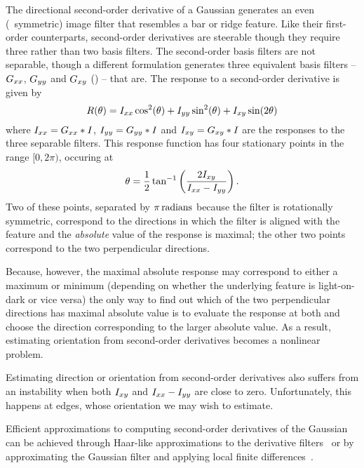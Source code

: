 \label{s:filtering_secondderivs}
%
%
%
The directional second-order derivative of a Gaussian generates an even (\ie~symmetric) image filter that resembles a bar or ridge feature. Like their first-order counterparts, second-order derivatives are steerable though they require three rather than two basis filters. The second-order basis filters are not separable, though a different formulation generates three equivalent basis filters -- $G_{xx}$, $G_{yy}$ and $G_{xy}$ () -- that are. The response to a second-order derivative is given by
%
\begin{equation}
R(\theta) = I_{xx} \cos^2(\theta) + I_{yy} \sin^2(\theta) + I_{xy} \sin(2\theta)
\label{e:secondderivs_response}
\end{equation}
%
\noindent where $I_{xx} = G_{xx}\ast I$, $I_{yy} = G_{yy}\ast I$ and $I_{xy} = G_{xy}\ast I$ are the responses to the three separable filters. This response function has four stationary points in the range $[0,2\pi)$, occuring at
%
\begin{equation}
\theta = \frac{1}{2} \tan^{-1}\left( \frac{2I_{xy}}{I_{xx}-I_{yy}} \right).
\label{e:secondderivs_orientation}
\end{equation}
%
\noindent Two of these points, separated by $\pi\,\text{radians}$ because the filter is rotationally symmetric, correspond to the directions in which the filter is aligned with the feature and the \emph{absolute} value of the response is maximal; the other two points correspond to the two perpendicular directions. 

Because, however, the maximal absolute response may correspond to either a maximum or minimum (depending on whether the underlying feature is light-on-dark or vice versa) the only way to find out which of the two perpendicular directions has maximal absolute value is to evaluate the response at both and choose the direction corresponding to the larger absolute value. As a result, estimating orientation from second-order derivatives becomes a nonlinear problem.

Estimating direction or orientation from second-order derivatives also suffers from an instability when both $I_{xy}$ and $I_{xx}-I_{yy}$ are close to zero. Unfortunately, this happens at edges, whose orientation we may wish to estimate.

Efficient approximations to computing second-order derivatives of the Gaussian can be achieved through Haar-like approximations to the derivative filters~\cite{Bay_etal_CVIU08} or by approximating the Gaussian filter and applying local finite differences~\cite{Kovesi_DICTA10}.